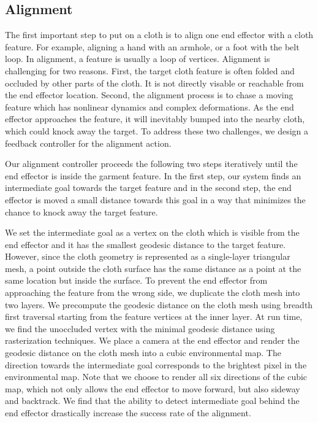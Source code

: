 \subsection{Alignment}
The first important step to put on a cloth is to align one end effector with a cloth feature. For example, aligning a hand with an armhole, or a foot with the belt loop. In alignment, a feature is usually a loop of vertices. Alignment is challenging for two reasons. First, the target cloth feature is often folded and occluded by other parts of the cloth. It is not directly visable or reachable from the end effector location. Second, the alignment process is to chase a moving feature which has nonlinear dynamics and complex deformations. As the end effector approaches the feature, it will inevitably bumped into the nearby cloth, which could knock away the target.  To address these two challenges, we design a feedback controller for the alignment action.

Our alignment controller proceeds the following two steps iteratively until the end effector is inside the garment feature. In the first step, our system finds an intermediate goal towards the target feature and in the second step, the end effector is moved a small distance towards this goal in a way that minimizes the chance to knock away the target feature.

We set the intermediate goal as a vertex on the cloth which is visible from the end effector and it has the smallest geodesic distance to the target feature. However, since the cloth geometry is represented as a single-layer triangular mesh, a point outside the cloth surface has the same distance as a point at the same location but inside the surface. To prevent the end effector from approaching the feature from the wrong side, we duplicate the cloth mesh into two layers.  We precompute the geodesic distance on the cloth mesh using breadth first traversal starting from the feature vertices at the inner layer. At run time, we find the unoccluded vertex with the minimal geodesic distance using rasterization techniques. We place a camera at the end effector and render the geodesic distance on the  cloth mesh into a cubic environmental map. The direction towards the intermediate goal corresponds to the brightest pixel in the environmental map. Note that we choose to render all six directions of the cubic map, which not only allows the end effector to move forward, but also sideway and backtrack. We find that the ability to detect intermediate goal behind the end effector drastically increase the success rate of the alignment.

